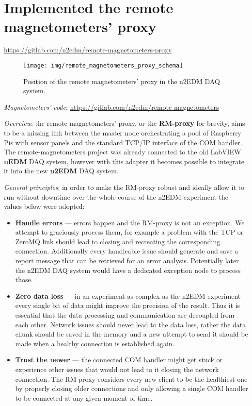 \section{Implemented the remote magnetometers' proxy}
\label{sec:rm-proxy}

\url{https://gitlab.com/n2edm/remote-magnetometers-proxy}

\begin{figure}[h]
	\texttt{[image: img/remote\_magnetometers\_proxy\_schema]}
	\caption{Position of the remote magnetometers' proxy in the n2EDM DAQ system.}
	\label{fig:rm-proxy_position}
\end{figure}

\textit{Magnetometers' code}: \url{https://gitlab.com/n2edm/remote-magnetometers}

\textit{Overview}: the remote magnetometers' proxy, or the \textbf{RM-proxy} for brevity, aims to be a missing link between the master node orchestrating a pool of Raspberry Pis with sensor panels and the standard TCP/IP interface of the COM handler. The remote-magnetometers project was already connected to the old LabVIEW \textbf{nEDM} DAQ system, however with this adapter it becomes possible to integrate it into the new \textbf{n2EDM} DAQ system.

\textit{General principles}: in order to make the RM-proxy robust and ideally allow it to run without downtime over the whole course of the n2EDM experiment the values below were adopted:

\begin{itemize}
	\item \textbf{Handle errors} --- errors happen and the RM-proxy is not an exception. We attempt to graciously process them, for example a problem with the TCP or ZeroMQ link should lead to closing and recreating the corresponding connection. Additionally every handleable issue should generate and save a report message that can be retrieved for an error analysis. Potentially later the n2EDM DAQ system would have a dedicated exception node to process those.
	\item \textbf{Zero data loss} --- in an experiment as complex as the n2EDM experiment every single bit of data might improve the precision of the result. Thus it is essential that the data processing and communication are decoupled from each other. Network issues should never lead to the data loss, rather the data chunk should be saved in the memory and a new attempt to send it should be made when a healthy connection is established again.
	\item \textbf{Trust the newer} --- the connected COM handler might get stuck or experience other issues that would not lead to it closing the network connection. The RM-proxy considers every new client to be the healthiest one by properly closing older connections and only allowing a single COM handler to be connected at any given moment of time.
\end{itemize}

